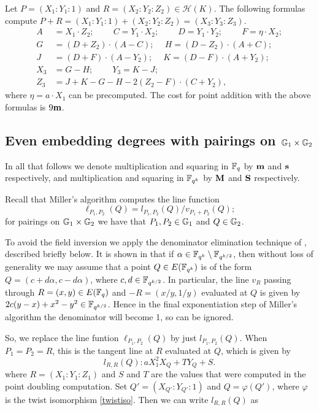 Let $P = (X_1 : Y_1 : 1)$ and $R = (X_2 : Y_2 : Z_2) \in \mathcal{H}(K)$.
The following formulas compute
$P + R = (X_1 : Y_1 : 1) + (X_2 : Y_2 : Z_2) = (X_3 : Y_3 : Z_3)$.
\begin{align*}
A &= X_1 \cdot Z_2;\	\qquad
C = Y_1 \cdot X_2;\	\qquad
D = Y_1 \cdot Y_2;\	\qquad
F = \eta \cdot X_2;\\
G &= (D + Z_2) \cdot (A - C);\	\quad
H = (D - Z_2) \cdot (A + C);\\
J &= (D + F) \cdot (A - Y_2);\	\quad
K = (D - F) \cdot (A + Y_2);\\
X_3 &= G - H;\	\qquad
Y_3 = K - J;\\
Z_3 &= J + K - G - H - 2(Z_2 - F) \cdot (C + Y_2),
\end{align*}
where $\eta = a\cdot X_1$ can be precomputed.
The cost for point addition with the above formulas is $9\textbf{m}$.

\subsection{Even embedding degrees with pairings on $\mathbb{G}_{1} \times \mathbb{G}_{2}$}

In all that follows we denote multiplication and squaring in $\mathbb{F}_{q}$ by $\textbf{m}$ and $\textbf{s}$ respectively, and multiplication and squaring in $\mathbb{F}_{q^k}$ by $\textbf{M}$ and $\textbf{S}$ respectively.

Recall that Miller's algorithm computes the line function 
$$\ell_{P_1,P_2}(Q) = l_{P_1,P_2}(Q)/v_{P_1 + P_2}(Q);$$
for pairings on $\mathbb{G}_{1} \times \mathbb{G}_{2}$ we have that $P_1, P_2 \in \mathbb{G}_{1}$ and $Q \in \mathbb{G}_{2}$.

To avoid the field inversion we apply the denominator elimination technique of \cite{2010/Gu},
described briefly below. 
It is shown in \cite[Section 4]{2010/Gu} that if
$\alpha \in \mathbb{F}_{q^k} \setminus \mathbb{F}_{q^{k/2}}$, then
without loss of generality we may assume that a point
$Q \in E(\mathbb{F}_{q^k})$ is of the form
$Q = (c+d\alpha, c-d\alpha )$, where
$c, d \in \mathbb{F}_{q^{k/2}}$.
In particular, the line $v_R$ passing through $R = (x,y) \in E(\mathbb{F}_{q})$ 
and $-R = (x/y, 1/y)$ evaluated at $Q$ is given by
$2c(y-x) + x^2-y^2 \in \mathbb{F}_{q^{k/2}}$.
Hence in the final exponentiation step of Miller's algorithm the denominator will become 1,
so can be ignored.

So, we replace the line funtion $\ell_{P_1,P_2}(Q)$ by just $l_{P_1,P_2}(Q)$.
When $P_1 = P_2 = R$, this is the tangent line at $R$ evaluated at $Q$, which is given by
\[l_{R,R}(Q): aX_1^2 X_Q + T Y_Q + S.\]
where $R = (X_1:Y_1:Z_1)$ 
and $S$ and $T$ are the values that were computed in the point doubling computation.
Set $Q' = (X_{Q'}:Y_{Q'}:1)$ and $Q = \varphi(Q')$, where
$\varphi$ is the twist isomorphism \eqref{twistiso}.
Then we can write $l_{R,R}(Q)$ as


